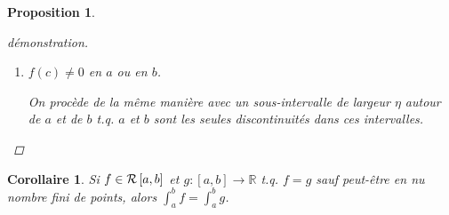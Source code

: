 \documentclass{report}
\newcommand*{\eps}{\varepsilon}
\newcommand*{\reels}{\mathbb{R}}
\newtheorem*{prop}{Proposition}
\newtheorem*{coro}{Corollaire}
\theoremstyle{definition}
\theoremstyle{remark}
\begin{document}
\begin{prop}
\begin{proof}[d\'emonstration]
\begin{enumerate}[label=\alph*)]
\begin{enumerate}[label=\arabic*)]
					De m\^eme, $\sinf{f}[\Delta_i] > \ssup{f}[\Delta_i] < \frac{\eps}{4}$, pour $i\in\{1,2\}$.

					et
					\begin{align*}
						\sinf{f}&= \sinf{f}[\Delta_1] + 2\eta \minf{f}[c-\eta,c+\eta] + \sinf{f}[\Delta_2]\\
						&\leq \sinf{f}[\Delta_1] + 2\eta \minf{f} + \sinf{f}[\Delta_2]\\
						&< -\frac{\eps}{4} - \frac{\eps}{2} - \frac{\eps}{4}\\
						&= -\eps
					\end{align*}

					Donc, $\eps < \sinf{f} \leq \ssup{f} < \eps$.

					Comme $\eps>0$ est arbirtaire, on en d\'eduit que $\int_{a}^{b}f=0$.
					\item $f(c)\neq0$ en $a$ ou en $b$.

					On proc\`ede de la m\^eme mani\`ere avec un sous-intervalle de largeur $\eta$ autour de $a$ et de $b$ t.q. $a$ et $b$ sont les seules discontinuit\'es dans ces intervalles.
				\end{enumerate}
			\end{enumerate}
		\end{proof}
	\end{prop}
	\begin{coro}
		Si $f \in \riemann$ et $g:[a,b] \to \reels$ t.q. $f=g$ sauf peut-\^etre en nu nombre fini de points, alors $\int_{a}^{b}f = \int_{a}^{b}g$.
	\end{coro}
\end{document}
